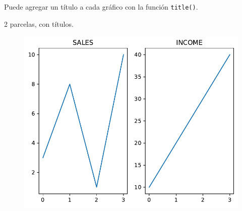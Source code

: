 Puede agregar un título a cada gráfico con la función \texttt{title()}.

\begin{code} 2 parcelas, con títulos.

\begin{Shaded}
\begin{Highlighting}[]

\OperatorTok{=}\NormalTok{ np.array([}\NormalTok{, }\NormalTok{, }\NormalTok{, }\NormalTok{])}
\OperatorTok{=}\NormalTok{ np.array([}\NormalTok{, }\NormalTok{, }\NormalTok{, }\NormalTok{])}

\NormalTok{, }\NormalTok{, }\NormalTok{)}
\NormalTok{)}

\OperatorTok{=}\NormalTok{ np.array([}\NormalTok{, }\NormalTok{, }\NormalTok{, }\NormalTok{])}
\OperatorTok{=}\NormalTok{ np.array([}\NormalTok{, }\NormalTok{, }\NormalTok{, }\NormalTok{])}

\NormalTok{, }\NormalTok{, }\NormalTok{)}
\NormalTok{)}

\end{Highlighting}
\end{Shaded}

\begin{figure}
  \centering
  \includegraphics[scale=0.6]{img/grafica1034.pdf}
\end{figure}
\end{code}

